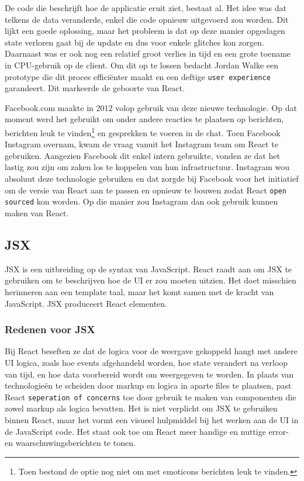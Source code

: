 De code die beschrijft hoe de applicatie eruit ziet, bestaat al. Het idee was dat telkens de data veranderde, enkel die code opnieuw uitgevoerd zou worden. Dit lijkt een goede oplossing, maar het probleem is dat op deze manier opgeslagen state verloren gaat bij de update en dus voor enkele glitches kon zorgen. Daarnaast was er ook nog een relatief groot verlies in tijd en een grote toename in CPU-gebruik op de client. Om dit op te lossen bedacht Jordan Walke een prototype die dit proces efficiënter maakt en een deftige \texttt{user experience} garandeert. Dit markeerde de geboorte van React. \autocite{Occhino2015}

Facebook.com maakte in 2012 volop gebruik van deze nieuwe technologie. Op dat moment werd het gebruikt om onder andere reacties te plaatsen op berichten, berichten leuk te vinden\footnote{Toen bestond de optie nog niet om met emoticons berichten leuk te vinden.} en gesprekken te voeren in de chat. Toen Facebook Instagram overnam, kwam de vraag vanuit het Instagram team om React te gebruiken. Aangezien Facebook dit enkel intern gebruikte, vonden ze dat het lastig zou zijn om zaken los te koppelen van hun infrastructuur. Instagram wou absoluut deze technologie gebruiken en dat zorgde bij Facebook voor het initiatief om de versie van React aan te passen en opnieuw te bouwen zodat React \texttt{open sourced} kon worden. Op die manier zou Instagram dan ook gebruik kunnen maken van React. \autocite{Occhino2013}


\subsection{JSX}

JSX is een uitbreiding op de syntax van JavaScript. React raadt aan om JSX te gebruiken om te beschrijven hoe de UI er zou moeten uitzien. Het doet misschien herinneren aan een template taal, maar het komt samen met de kracht van JavaScript. JSX produceert React elementen. \autocite{React2019a}

\subsubsection{Redenen voor JSX}

Bij React beseften ze dat de logica voor de weergave gekoppeld hangt met andere UI logica, zoals hoe events afgehandeld worden, hoe state verandert na verloop van tijd, en hoe data voorbereid wordt om weergegeven te worden. In plaats van technologieën te scheiden door markup en logica in aparte files te plaatsen, past React \texttt{seperation of concerns} toe door gebruik te maken van componenten die zowel markup als logica bevatten. Het is niet verplicht om JSX te gebruiken binnen React, maar het vormt een visueel hulpmiddel bij het werken aan de UI in de JavaScript code. Het staat ook toe om React meer handige en nuttige error- en waarschuwingsberichten te tonen. \autocite{React2019a}


